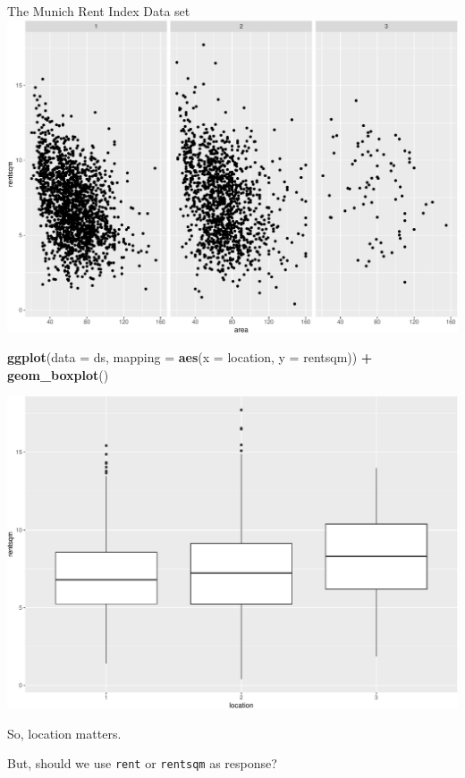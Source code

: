 \documentclass[
  ignorenonframetext,
]{beamer}
\newenvironment{Shaded}{\begin{snugshade}}{\end{snugshade}}
\newcommand{\AttributeTok}[1]{\textcolor[rgb]{0.13,0.29,0.53}{#1}}
\newcommand{\FunctionTok}[1]{\textcolor[rgb]{0.13,0.29,0.53}{\textbf{#1}}}
\newcommand{\NormalTok}[1]{#1}
\newcommand{\SpecialCharTok}[1]{\textcolor[rgb]{0.81,0.36,0.00}{\textbf{#1}}}
\begin{document}
\begin{frame}[fragile]
\begin{block}{The Munich Rent Index Data set}
\includegraphics{Module01IntroPresentation_files/figure-beamer/unnamed-chunk-4-1.pdf}

\begin{Shaded}
\begin{Highlighting}[]
\FunctionTok{ggplot}\NormalTok{(}\AttributeTok{data =}\NormalTok{ ds, }\AttributeTok{mapping =} \FunctionTok{aes}\NormalTok{(}\AttributeTok{x =}\NormalTok{ location, }\AttributeTok{y =}\NormalTok{ rentsqm)) }\SpecialCharTok{+} 
  \FunctionTok{geom\_boxplot}\NormalTok{()}
\end{Highlighting}
\end{Shaded}

\includegraphics{Module01IntroPresentation_files/figure-beamer/unnamed-chunk-4-2.pdf}

So, location matters.

But, should we use \texttt{rent} or \texttt{rentsqm} as response?


\end{block}
\end{frame}
\end{document}
